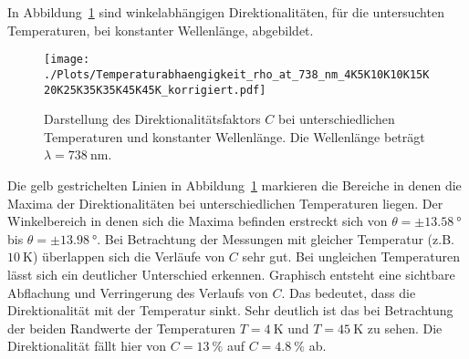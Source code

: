 In Abbildung~\ref{fig:temp_all_nach} sind winkelabhängigen Direktionalitäten, für die untersuchten Temperaturen,
bei konstanter Wellenlänge, abgebildet.
\begin{figure}
    \centering
    \texttt{[image: ./Plots/Temperaturabhaengigkeit\_rho\_at\_738\_nm\_4K5K10K10K15K20K25K35K35K45K45K\_korrigiert.pdf]}
    \caption{Darstellung des Direktionalitätsfaktors $C$ bei unterschiedlichen Temperaturen und konstanter Wellenlänge.
    Die Wellenlänge beträgt $\lambda =\SI{738}{\nano\meter}$.}
    \label{fig:temp_all_nach}
\end{figure}
\FloatBarrier

Die gelb gestrichelten Linien in Abbildung~\ref{fig:temp_all_nach} markieren die Bereiche 
in denen die Maxima der Direktionalitäten
bei unterschiedlichen Temperaturen liegen.
Der Winkelbereich in denen sich die Maxima befinden erstreckt sich von  $\theta = \pm \SI{13,58}{\degree} 
$ bis $ \theta = \pm \SI{13,98}{\degree}$.
Bei Betrachtung der Messungen mit gleicher Temperatur (z.B. $\SI{10}{\kelvin}$) 
überlappen sich die Verläufe von $C$ sehr gut.
Bei ungleichen Temperaturen lässt sich ein deutlicher Unterschied erkennen.
Graphisch entsteht eine sichtbare Abflachung und Verringerung des Verlaufs von $C$.
Das bedeutet, dass die Direktionalität mit der Temperatur sinkt.
Sehr deutlich ist das bei Betrachtung der beiden Randwerte 
der Temperaturen $T = \SI{4}{\kelvin}$ und $ T = \SI{45}{\kelvin}$ zu sehen.
Die Direktionalität fällt hier von $C= \SI{13}{\percent}$ auf $C = \SI{4,8}{\percent}$ ab.

